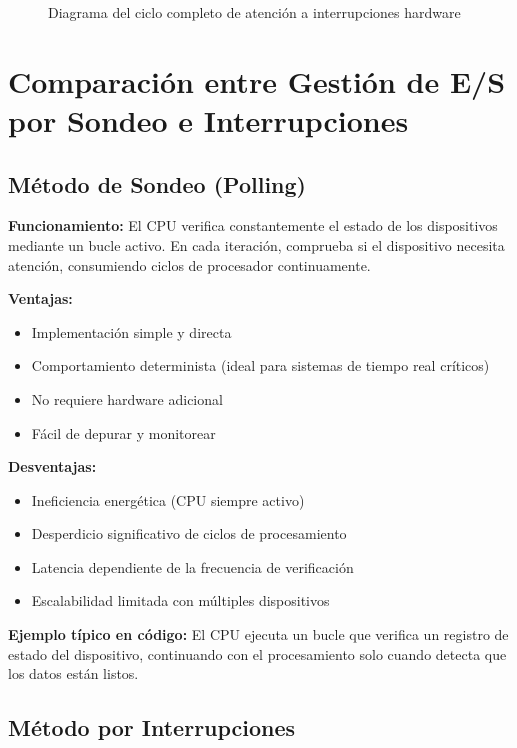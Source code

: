 \documentclass{article}
\begin{document}
\begin{figure}[h]
\caption{Diagrama del ciclo completo de atención a interrupciones hardware}
\end{figure}
\section{Comparación entre Gestión de E/S por Sondeo e Interrupciones}
\subsection{Método de Sondeo (Polling)}

\textbf{Funcionamiento:}
El CPU verifica constantemente el estado de los dispositivos mediante un bucle activo. En cada iteración, comprueba si el dispositivo necesita atención, consumiendo ciclos de procesador continuamente.

\textbf{Ventajas:}
\begin{itemize}[leftmargin=*]
    \item Implementación simple y directa
    \item Comportamiento determinista (ideal para sistemas de tiempo real críticos)
    \item No requiere hardware adicional
    \item Fácil de depurar y monitorear
\end{itemize}

\textbf{Desventajas:}
\begin{itemize}[leftmargin=*]
    \item Ineficiencia energética (CPU siempre activo)
    \item Desperdicio significativo de ciclos de procesamiento
    \item Latencia dependiente de la frecuencia de verificación
    \item Escalabilidad limitada con múltiples dispositivos
\end{itemize}

\textbf{Ejemplo típico en código:}
El CPU ejecuta un bucle que verifica un registro de estado del dispositivo, continuando con el procesamiento solo cuando detecta que los datos están listos.

\subsection{Método por Interrupciones}
\end{document}
